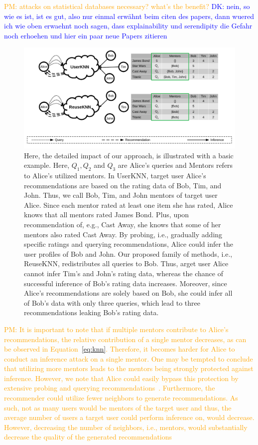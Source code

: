 \documentclass[manuscript,review,anonymous]{acmart}
\newcommand{\dk}[1]{
        \textcolor{blue}{DK: #1}}
\newcommand{\pmu}[1]{
        \textcolor{orange}{PM: #1}}
\begin{document}
\pmu{attacks on statistical databases necessary? what's the benefit?} \dk{nein, so wie es ist, ist es gut, also nur einmal erwähnt beim citen des papers, dann wuered ich wie oben erwaehnt noch sagen, dass explainability und serendipity die Gefahr noch erhoehen und hier ein paar neue Papers zitieren}

\begin{figure}[!htb]
    \centering
    \includegraphics[width=\textwidth]{figures/approach.pdf}
    \caption{Here, the detailed impact of our approach, is illustrated with a basic example. Here, $Q_1, Q_2$ and $Q_3$ are Alice's queries and Mentors refers to Alice's utilized mentors. In UserKNN, target user Alice's recommendations are based on the rating data of Bob, Tim, and John. Thus, we call Bob, Tim, and John mentors of target user Alice. 
    Since each mentor rated at least one item she has rated, Alice knows that all mentors rated James Bond. Plus, upon recommendation of, e.g., Cast Away, she knows that some of her mentors also rated Cast Away. By probing, i.e., gradually adding specific ratings and querying recommendations, Alice could infer the user profiles of Bob and John.
    Our proposed family of methods, i.e., ReuseKNN, redistributes all queries to Bob. Thus, arget user Alice cannot infer Tim's and John's rating data, whereas the chance of successful inference of Bob's rating data increases. Moreover, since Alice's recommendations are solely based on Bob, she could infer all of Bob's data with only three queries, which lead to three recommendations leaking Bob's rating data.
    }
    \label{fig:approach}
\end{figure}

\pmu{ It is important to note that if multiple mentors contribute to Alice's recommendations, the relative contribution of a single mentor decreases, as can be observed in Equation~\ref{eq:knn}.
Therefore, it becomes harder for Alice to conduct an inference attack on a single mentor.
One may be tempted to conclude that utilizing more mentors leads to the mentors being strongly protected against inference. 
However, we note that Alice could easily bypass this protection by extensive probing and querying recommendations~\cite{calandrino2011you}.
Furthermore, the recommender could utilize fewer neighbors to generate recommendations.
As such, not as many users would be mentors of the target user and thus, the average number of users a target user could perform inference on, would decrease.
However, decreasing the number of neighbors, i.e., mentors, would substantially decrease the quality of the generated recommendations~\cite{herlocker1999algorithmic,herlocker2002empirical}}
\end{document}
